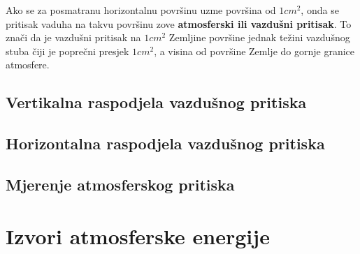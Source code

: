 	Ako se za posmatranu horizontalnu površinu uzme površina od $1cm^{2}$, onda se pritisak vaduha na takvu površinu zove \textbf{atmosferski ili vazdušni pritisak}.
	To znači da je vazdušni pritisak na $1cm^{2}$ Zemljine površine jednak težini vazdušnog stuba čiji je poprečni presjek  $1cm^{2}$, a visina od površine Zemlje do gornje granice atmosfere.
	\subsection{Vertikalna raspodjela vazdušnog pritiska}
	
	\subsection{Horizontalna raspodjela vazdušnog pritiska}
	
	\subsection{Mjerenje atmosferskog pritiska}
	
	
	\section{Izvori atmosferske energije}
